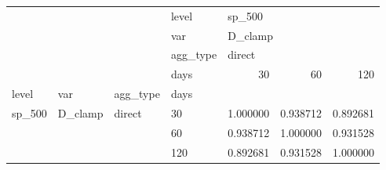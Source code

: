 \begin{tabular}{llllrrr}
\toprule
       &         &        & level & \multicolumn{3}{l}{sp\_500} \\
       &         &        & var & \multicolumn{3}{l}{D\_clamp} \\
       &         &        & agg\_type & \multicolumn{3}{l}{direct} \\
       &         &        & days &       30  &       60  &       120 \\
level & var & agg\_type & days &           &           &           \\
\midrule
sp\_500 & D\_clamp & direct & 30  &  1.000000 &  0.938712 &  0.892681 \\
       &         &        & 60  &  0.938712 &  1.000000 &  0.931528 \\
       &         &        & 120 &  0.892681 &  0.931528 &  1.000000 \\
\bottomrule
\end{tabular}
